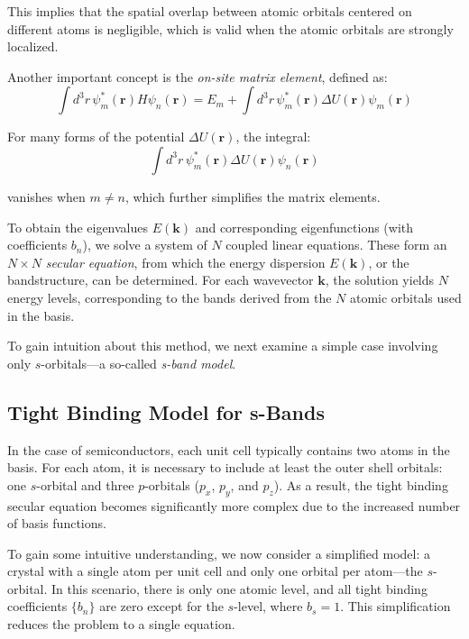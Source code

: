 \noindent
This implies that the spatial overlap between atomic orbitals centered on different atoms is negligible, which is valid when the atomic orbitals are strongly localized.

Another important concept is the \textit{on-site matrix element}, defined as:
\begin{equation}
	\int d^3r \, \psi_m^*(\mathbf{r}) H \psi_n(\mathbf{r}) = E_m + \int d^3r \, \psi_m^*(\mathbf{r}) \Delta U(\mathbf{r}) \psi_m(\mathbf{r})
\end{equation}

\noindent
For many forms of the potential \( \Delta U(\mathbf{r}) \), the integral:
\begin{equation}
	\int d^3r \, \psi_m^*(\mathbf{r}) \Delta U(\mathbf{r}) \psi_n(\mathbf{r})
\end{equation}

\noindent
vanishes when \( m \neq n \), which further simplifies the matrix elements.

To obtain the eigenvalues \( E(\mathbf{k}) \) and corresponding eigenfunctions (with coefficients \( b_n \)), we solve a system of \( N \) coupled linear equations. These form an \( N \times N \) \textit{secular equation}, from which the energy dispersion \( E(\mathbf{k}) \), or the bandstructure, can be determined. For each wavevector \( \mathbf{k} \), the solution yields \( N \) energy levels, corresponding to the bands derived from the \( N \) atomic orbitals used in the basis.

To gain intuition about this method, we next examine a simple case involving only $s$-orbitals—a so-called \textit{s-band model}.

\subsection{Tight Binding Model for s-Bands}
In the case of semiconductors, each unit cell typically contains two atoms in the basis. For each atom, it is necessary to include at least the outer shell orbitals: one \(s\)-orbital and three \(p\)-orbitals (\(p_x\), \(p_y\), and \(p_z\)). As a result, the tight binding secular equation becomes significantly more complex due to the increased number of basis functions.

To gain some intuitive understanding, we now consider a simplified model: a crystal with a single atom per unit cell and only one orbital per atom—the \(s\)-orbital. In this scenario, there is only one atomic level, and all tight binding coefficients \( \{b_n\} \) are zero except for the \(s\)-level, where \( b_s = 1 \). This simplification reduces the problem to a single equation.

